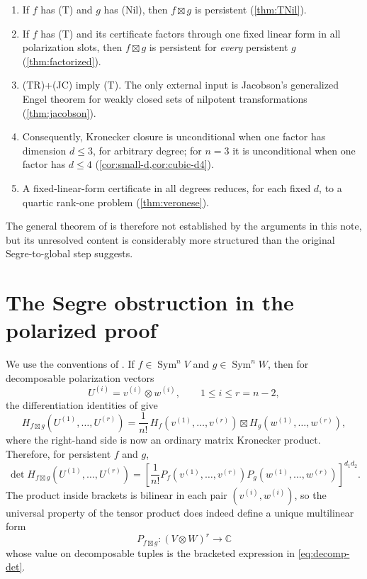 \documentclass[11pt]{amsart}
\newcommand{\C}{\mathbb C}
\newcommand{\Sym}{\operatorname{Sym}}
\newcommand{\boxt}{\mathbin{\boxtimes}}
\begin{document}
\begin{enumerate}[label=(\roman*),leftmargin=2.3em]
\item If $f$ has (T) and $g$ has (Nil), then $f\boxt g$ is persistent
      (\cref{thm:TNil}).
\item If $f$ has (T) and its certificate factors through one fixed linear
      form in all polarization slots, then $f\boxt g$ is persistent for
      \emph{every} persistent $g$ (\cref{thm:factorized}).
\item (TR)+(JC) imply (T).  The only external input is Jacobson's generalized
      Engel theorem for weakly closed sets of nilpotent transformations
      (\cref{thm:jacobson}).
\item Consequently, Kronecker closure is unconditional when one factor has
      dimension $d\le3$, for arbitrary degree; for $n=3$ it is unconditional
      when one factor has $d\le4$ (\cref{cor:small-d,cor:cubic-d4}).
\item A fixed-linear-form certificate in all degrees reduces, for each fixed
      $d$, to a quartic rank-one problem (\cref{thm:veronese}).
\end{enumerate}

The general theorem of \cite{G26} is therefore not established by the arguments
in this note, but its unresolved content is considerably more structured than
the original Segre-to-global step suggests.

\section{The Segre obstruction in the polarized proof}

We use the conventions of \cite{G26}.  If
$f\in\Sym^n V$ and $g\in\Sym^n W$, then for decomposable polarization
vectors
\[
 U^{(i)}=v^{(i)}\otimes w^{(i)},\qquad 1\le i\le r=n-2,
\]
the differentiation identities of \cite[Proposition~7 and
Corollary~8]{G26} give
\begin{equation}\label{eq:decomp-H}
 H_{f\boxt g}(U^{(1)},\ldots,U^{(r)})
 =\frac1{n!}\,H_f(v^{(1)},\ldots,v^{(r)})
        \boxt H_g(w^{(1)},\ldots,w^{(r)}),
\end{equation}
where the right-hand side is now an ordinary matrix Kronecker product.
Therefore, for persistent $f$ and $g$,
\begin{equation}\label{eq:decomp-det}
 \det H_{f\boxt g}(U^{(1)},\ldots,U^{(r)})
 =\left[
   \frac1{n!}P_f(v^{(1)},\ldots,v^{(r)})
                P_g(w^{(1)},\ldots,w^{(r)})
  \right]^{d_1d_2}.
\end{equation}
The product inside brackets is bilinear in each pair
$(v^{(i)},w^{(i)})$, so the universal property of the tensor product does
indeed define a unique multilinear form
\begin{equation}\label{eq:Ph-def}
 P_{f\boxt g}:(V\otimes W)^r\longrightarrow\C
\end{equation}
whose value on decomposable tuples is the bracketed expression in
\eqref{eq:decomp-det}.
\end{document}

